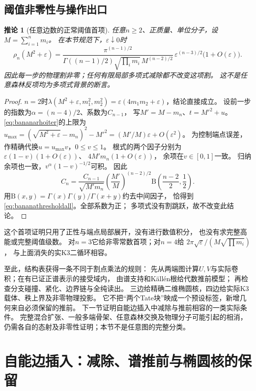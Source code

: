 \documentclass[11pt,a4paper]{ctexart}
\theoremstyle{cnplain}\newtheorem{theorem}{定理}[section]
\newtheorem{corollary}[theorem]{推论}
\theoremstyle{definition}\newtheorem{definition}[theorem]{定义}
\theoremstyle{remark}\newtheorem{remark}[theorem]{注}
\begin{document}
\subsection{阈值非零性与操作出口}
\begin{corollary}[任意边数的正常阈值首项]\label{cor:bananathresholdall}
任意$n\ge2$、正质量、单位分子，设$M=\sum_{i=1}^n m_i$。
在本节规范下，$\varepsilon\downarrow0$时
\begin{equation}\label{eq:bananathresholdall}
 \rho_n(M^2+\varepsilon)=
 \frac{\pi^{(n-1)/2}}
 {\Gamma((n-1)/2)\sqrt{\prod_i m_i}\,M^{(n-2)/2}}\,
 \varepsilon^{(n-3)/2}\bigl(1+O(\varepsilon)\bigr).
\end{equation}
因此每一步的物理割非零；任何有限局部多项式减除都不改变这项割。
这不是任意森林反项均为多项式背景的断言。
\end{corollary}
\begin{proof}
$n=2$时$\lambda(M^2+\varepsilon,m_1^2,m_2^2)
=\varepsilon(4m_1m_2+\varepsilon)$，结论直接成立。
设前一步的指数为$\alpha=(n-4)/2$、系数为$C_{n-1}$，
写$M'=M-m_n$、$t=M'^2+u$。
\eqref{eq:bananarhoiter}的上限为
$u_{\max}=(\sqrt{M^2+\varepsilon}-m_n)^2-M'^2
=(M'/M)\varepsilon+O(\varepsilon^2)$。
为控制端点误差，作精确代换$u=u_{\max}v$，$0\le v\le1$。
根式的两个因子分别为
$\varepsilon(1-v)(1+O(\varepsilon))$、
$4M'm_n(1+O(\varepsilon))$，
余项在$v\in[0,1]$一致。
归纳余项也一致，$v^\alpha(1-v)^{-1/2}$可积。
因此
\[
 C_n=\frac{C_{n-1}}{\sqrt{M'm_n}}
       \left(\frac{M'}M\right)^{(n-2)/2}
       \mathrm B\left(\frac{n-2}2,\frac12\right).
\]
用$\mathrm B(x,y)=\Gamma(x)\Gamma(y)/\Gamma(x+y)$约去中间因子，
恰得到\eqref{eq:bananathresholdall}。全部系数为正；
多项式没有割跳跃，故不改变此结论。
\end{proof}

这个首项证明只用了正性与端点局部展开，没有进行数值积分，
也没有求完整高能或完整阈值级数。
对$n=3$它给非零常数首项；对$n=4$给
$2\pi\sqrt{\varepsilon}/(M\sqrt{\prod m_i})$，
与上面消失的实K3二循环相容。

至此，结构表获得一条不同于割点乘法的规则：
先从两端图计算$U,V$与实际卷积；在有已证正谱表示的接受域内，
由谱支持和Källén根给代数推前模型；
再检查分支碰撞、紧化、边界链与全纯读出。
三边给精确二维椭圆核，四边给实际K3载体、秩上界及非零物理投影。
它不把“两个Tate块”映成一个预设标签，新增几何来自必须保留的推前。
下一节证明自能边插入中减除与推前相容的一类实际条件。
完整混合扩张、一般多端骨架、任意森林交换及物理分子可能引起的相消，
仍需各自的态射及非零性证明；本节不是任意图的完整分类。


\section{自能边插入：减除、谱推前与椭圆核的保留}\label{sec:selfinsert}
\end{document}
